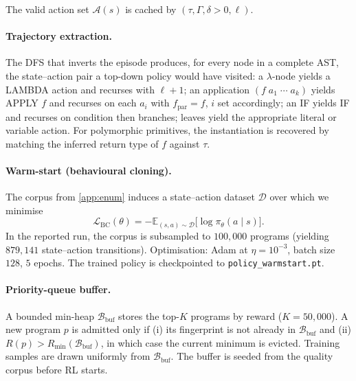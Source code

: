 \documentclass[12pt]{article}
\begin{document}
The valid action set $\mathcal{A}(s)$ is cached by $(\tau, \Gamma, \delta > 0, \ell)$.

\paragraph{Trajectory extraction.} The DFS that inverts the episode produces, for every node in a complete AST, the state--action pair a top-down policy would have visited: a $\lambda$-node yields a LAMBDA action and recurses with $\ell+1$; an application $(f\;a_1\;\cdots\;a_k)$ yields APPLY $f$ and recurses on each $a_i$ with $f_{\text{par}} = f$, $i$ set accordingly; an IF yields IF and recurses on condition then branches; leaves yield the appropriate literal or variable action. For polymorphic primitives, the instantiation is recovered by matching the inferred return type of $f$ against $\tau$.

\paragraph{Warm-start (behavioural cloning).} The corpus from \cref{app:enum} induces a state--action dataset $\mathcal{D}$ over which we minimise
\[
  \mathcal{L}_{\mathrm{BC}}(\theta) = -\mathbb{E}_{(s, a) \sim \mathcal{D}}\bigl[\log \pi_\theta(a \mid s)\bigr].
\]
In the reported run, the corpus is subsampled to $100{,}000$ programs (yielding $879{,}141$ state--action transitions). Optimisation: Adam at $\eta = 10^{-3}$, batch size $128$, $5$ epochs. The trained policy is checkpointed to \texttt{policy\_warmstart.pt}.

\paragraph{Priority-queue buffer.} A bounded min-heap $\mathcal{B}_{\mathrm{buf}}$ stores the top-$K$ programs by reward ($K = 50{,}000$). A new program $p$ is admitted only if (i) its fingerprint is not already in $\mathcal{B}_{\mathrm{buf}}$ and (ii) $R(p) > R_{\min}(\mathcal{B}_{\mathrm{buf}})$, in which case the current minimum is evicted. Training samples are drawn uniformly from $\mathcal{B}_{\mathrm{buf}}$. The buffer is seeded from the quality corpus before RL starts.
\end{document}
